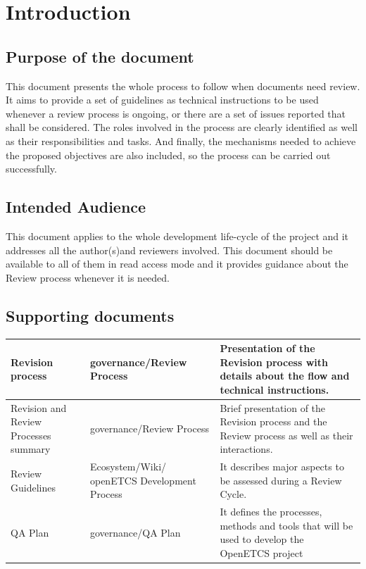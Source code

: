 \documentclass{template/openetcs_article}
\begin{document}
\newpage

\section{Introduction}

\subsection[Introduction]{Purpose of the document}
This document presents the whole process to follow when documents need review. It aims to provide a set of guidelines as technical instructions to be used whenever a review process is ongoing, or there are a set of issues reported that shall be considered. The roles involved in the process are clearly identified as well as their responsibilities and tasks. And finally, the mechanisms needed to achieve the proposed objectives are also included, so the process can be carried out successfully.

\subsection{Intended Audience}
This document applies to the whole development life-cycle of the project and it addresses all the author(s)and reviewers involved. This document should be available to all of them in read access mode and it provides guidance about the Review process whenever it is needed. 

\subsection{Supporting documents}
\tablehead{}
\tabletail{}
\tablelasttail{}
\begin{supertabular}{|m{3cm}m{3,5cm}m{7,5cm}|}
\hline
Revision process &
governance/Review Process &
Presentation of the Revision process with details about the flow and technical instructions.
\\\hline
Revision and Review Processes summary &
governance/Review Process &
Brief presentation of the Revision process and the Review process as well as their interactions.
\\\hline
Review Guidelines &
Ecosystem/Wiki/ openETCS Development Process &
It describes major aspects to be assessed during a Review Cycle.
\\\hline
QA Plan & governance/QA Plan & It defines the processes, methods and tools that will be used to develop the OpenETCS project
\\\hline
\end{supertabular}
\end{document}
